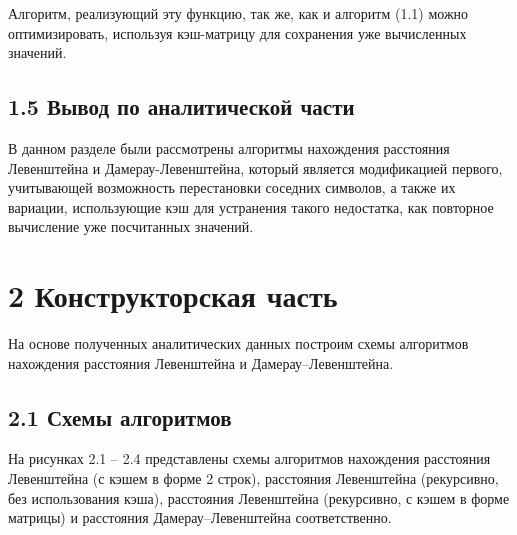 \documentclass[12pt, a4paper]{report}
\begin{document}
Алгоритм, реализующий эту функцию, так же, как и алгоритм (1.1) можно оптимизировать, используя кэш-матрицу для сохранения уже вычисленных значений.

\section*{1.5 Вывод по аналитической части}

В данном разделе были рассмотрены алгоритмы нахождения расстояния Левенштейна и Дамерау-Левенштейна, который является модификацией первого, учитывающей возможность перестановки соседних символов, а также их вариации, использующие кэш для устранения такого недостатка, как повторное вычисление уже посчитанных значений.

\newpage
\chapter*{2 Конструкторская часть}

На основе полученных аналитических данных построим схемы алгоритмов нахождения расстояния Левенштейна и Дамерау--Левенштейна.

\section*{2.1 Схемы алгоритмов}
На рисунках 2.1 -- 2.4 представлены схемы алгоритмов нахождения расстояния Левенштейна (с кэшем в форме 2 строк), расстояния Левенштейна (рекурсивно, без использования кэша), расстояния Левенштейна (рекурсивно, с кэшем в форме матрицы) и расстояния Дамерау--Левенштейна соответственно.
\end{document}
